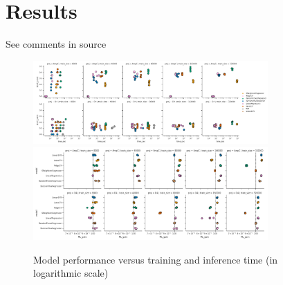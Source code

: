 \section{Results}

See comments in source

\begin{figure}[h]
\centering
\includegraphics[width=0.8\textwidth]{figures/Figure_4.png}
\includegraphics[width=0.8\textwidth]{figures/Figure_4_gain.png}
\caption{Model performance versus training and inference time (in logarithmic scale)}
\end{figure}





